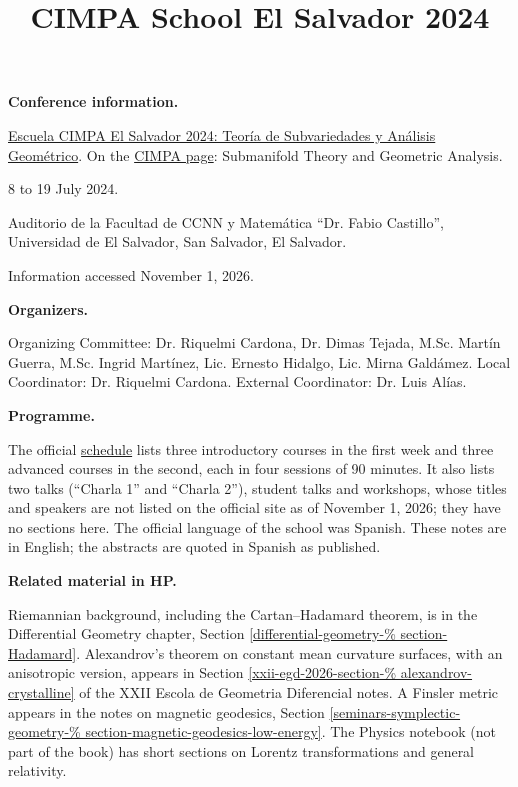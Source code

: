 



\title{CIMPA School El Salvador 2024}
\maketitle

\label{section-phantom}

\tableofcontents

\medskip\noindent
{\bf Conference information.}

\href{%
https://naturales.ues.edu.sv/%
ecimpasv2024/}{%
Escuela CIMPA El Salvador 2024:
Teoría de Subvariedades y Análisis
Geométrico}.
On the
\href{https://cimpa.info/en/node/7295}{%
CIMPA page}: Submanifold Theory and
Geometric Analysis.

8 to 19 July 2024.

Auditorio de la Facultad de CCNN y
Matemática ``Dr. Fabio Castillo'',
Universidad de El Salvador,
San Salvador, El Salvador.

Information accessed November 1, 2026.

\medskip\noindent
{\bf Organizers.}

Organizing Committee: Dr. Riquelmi
Cardona, Dr. Dimas Tejada, M.Sc. Martín
Guerra, M.Sc. Ingrid Martínez, Lic.
Ernesto Hidalgo, Lic. Mirna Galdámez.
Local Coordinator: Dr. Riquelmi Cardona.
External Coordinator: Dr. Luis Alías.

\medskip\noindent
{\bf Programme.}

The official
\href{%
https://naturales.ues.edu.sv/%
ecimpasv2024/schedule/}{%
schedule} lists three introductory
courses in the first week and three
advanced courses in the second, each in
four sessions of 90 minutes. It also lists
two talks (``Charla 1'' and ``Charla 2''),
student talks and workshops, whose titles
and speakers are not listed on the
official site as of November 1, 2026; they
have no sections here. The official
language of the school was Spanish. These
notes are in English; the abstracts are
quoted in Spanish as published.

\medskip\noindent
{\bf Related material in HP.}

Riemannian background, including the
Cartan--Hadamard theorem, is in the
Differential Geometry chapter, Section
\ref{differential-geometry-%
section-Hadamard}.
Alexandrov's theorem on constant mean
curvature surfaces, with an anisotropic
version, appears in Section
\ref{xxii-egd-2026-section-%
alexandrov-crystalline}
of the XXII Escola de Geometria
Diferencial notes. A Finsler metric
appears in the notes on magnetic
geodesics, Section
\ref{seminars-symplectic-geometry-%
section-magnetic-geodesics-low-energy}.
The Physics notebook (not part of the
book) has short sections on Lorentz
transformations and general relativity.


